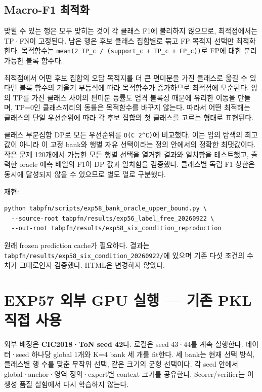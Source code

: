 \subsection{Macro-F1 최적화}
맞힐 수 있는 행은 모두 맞히는 것이 각 클래스 F1에 불리하지 않으므로, 최적점에서는 TP·FN이 고정된다. 남은 행은 후보 클래스 집합별로 묶고 FP 목적지 선택만 최적화한다. 목적함수는 \texttt{mean(2 T\allowbreak{}P\_\allowbreak{}\allowbreak{}c /\allowbreak{}\allowbreak{} (s\allowbreak{}upport\_\allowbreak{}\allowbreak{}c\allowbreak{} +\allowbreak{}\allowbreak{} TP\_\allowbreak{}\allowbreak{}c \allowbreak{}+\allowbreak{}\allowbreak{} FP\_\allowbreak{}\allowbreak{}c))\allowbreak{}}로 FP에 대한 분리 가능한 볼록 함수다.

최적점에서 어떤 후보 집합의 오답 목적지를 더 큰 편미분을 가진 클래스로 옮길 수 있다면 볼록 함수의 기울기 부등식에 따라 목적함수가 증가하므로 최적점에 모순된다. 양의 TP를 가진 클래스 사이의 편미분 동률도 엄격 볼록성 때문에 유리한 이동을 만들며, TP=\allowbreak{}0인 클래스끼리의 동률은 목적함수를 바꾸지 않는다. 따라서 어떤 최적해는 클래스의 단일 우선순위에 따라 각 후보 집합의 첫 클래스를 고르는 형태로 표현된다.

클래스 부분집합 DP로 모든 우선순위를 \texttt{O(C 2\textasciicircum{}C)\allowbreak{}}에 비교했다. 이는 임의 탐색의 최고값이 아니라 이 고정 bank와 행별 자유 선택이라는 정의 안에서의 정확한 최댓값이다. 작은 문제 120개에서 가능한 모든 행별 선택을 열거한 결과와 일치함을 테스트했고, 출력한 oracle 예측 배열의 F1이 DP 값과 일치함을 검증했다. 클래스별 독립 F1 상한은 동시에 달성되지 않을 수 있으므로 별도 열로 구분했다.

재현:


\begin{Verbatim}[breaklines=true,breakanywhere=true,fontsize=\scriptsize]
python tabpfn/scripts/exp58_bank_oracle_upper_bound.py \
  --source-root tabpfn/results/exp56_label_free_20260922 \
  --out-root tabpfn/results/exp58_six_condition_reproduction

\end{Verbatim}
원래 frozen prediction cache가 필요하다. 결과는 \texttt{tabpfn/\allowbreak{}\allowbreak{}r\allowbreak{}esults/\allowbreak{}\allowbreak{}e\allowbreak{}xp58\_\allowbreak{}\allowbreak{}six\allowbreak{}\_\allowbreak{}\allowbreak{}conditi\allowbreak{}on\_\allowbreak{}\allowbreak{}20260\allowbreak{}922/\allowbreak{}\allowbreak{}}에 있으며 기존 다섯 조건의 수치가 그대로인지 검증했다. HTML은 변경하지 않았다.



\section{EXP57 외부 GPU 실행 — 기존 PKL 직접 사용}
외부 배정은 \textbf{CIC2018·ToN seed 42}다. 로컬은 seed 43·44를 계속 실행한다. 데이터·seed 하나당 global 1개와 K=\allowbreak{}4 bank 세 개를 fit한다. 세 bank는 현재 선택 방식, 클래스별 행 수를 맞춘 무작위 선택, 같은 크기의 균형 선택이다. 각 seed 안에서 global·anchor·영역 정의·expert별 context 크기를 공유한다. Scorer/\allowbreak{}verifier는 이 생성 품질 실험에서 다시 학습하지 않는다.

